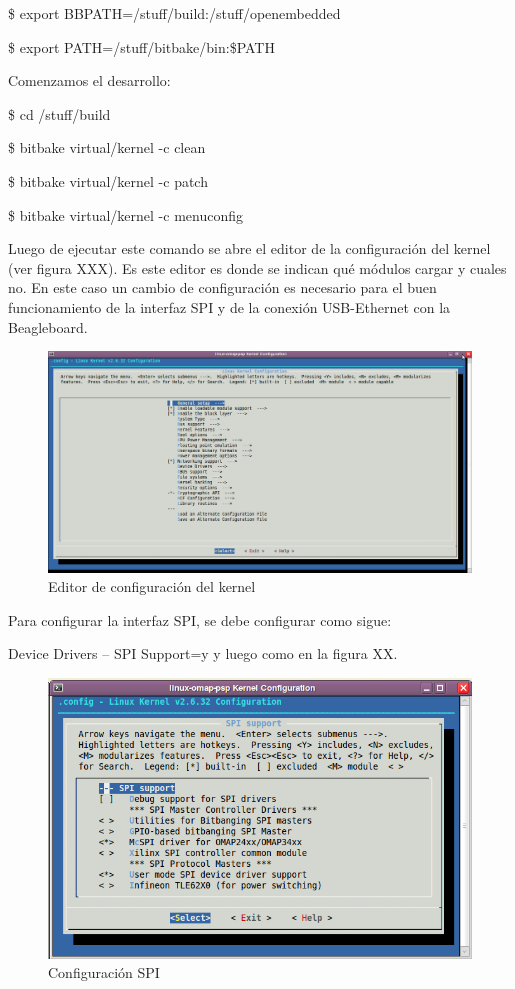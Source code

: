 \$ export BBPATH=/stuff/build:/stuff/openembedded

\$ export PATH=/stuff/bitbake/bin:\$PATH

Comenzamos el desarrollo:

\$ cd /stuff/build

\$ bitbake virtual/kernel -c clean

\$ bitbake virtual/kernel -c patch

\$ bitbake virtual/kernel -c menuconfig


Luego de ejecutar este comando se abre el editor de la configuración del kernel (ver figura XXX). Es este editor es donde se indican qué módulos cargar y cuales no. En este caso un cambio de  configuración es necesario para el buen funcionamiento de la interfaz SPI y de la conexión USB-Ethernet con la Beagleboard.

\begin{figure}[H]
\centering
  \begin{center}
  \includegraphics[scale=.3]{Imagenes/kernel.png} 
  \end{center}
  \caption{Editor de configuración del kernel}\label{Fig:HW} 
\end{figure}

Para configurar la interfaz SPI, se debe configurar como sigue:

Device Drivers – SPI Support=y y luego como en la figura XX.

\begin{figure}[H]
\centering
  \begin{center}
  \includegraphics[scale=.4]{Imagenes/spi_chica.png} 
  \end{center}
  \caption{Configuración SPI}\label{Fig:HW} 
\end{figure}


